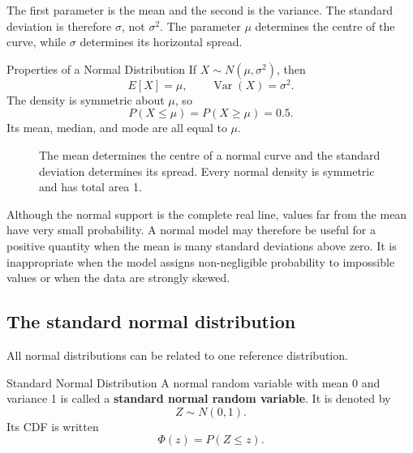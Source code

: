 The first parameter is the mean and the second is the variance. The standard deviation is therefore $\sigma$, not $\sigma^2$. The parameter $\mu$ determines the centre of the curve, while $\sigma$ determines its horizontal spread.

\begin{theorem}{Properties of a Normal Distribution}
If $X\sim N(\mu,\sigma^2)$, then
\[
    E[X]=\mu,
    \qquad
    \operatorname{Var}(X)=\sigma^2.
\]
The density is symmetric about $\mu$, so
\[
    P(X\leq\mu)=P(X\geq\mu)=0.5.
\]
Its mean, median, and mode are all equal to $\mu$.
\end{theorem}

\begin{figure}[htbp]
\centering
{}
\caption{The mean determines the centre of a normal curve and the standard deviation determines its spread. Every normal density is symmetric and has total area 1.}
\label{fig:normal-location-scale}
\end{figure}

Although the normal support is the complete real line, values far from the mean have very small probability. A normal model may therefore be useful for a positive quantity when the mean is many standard deviations above zero. It is inappropriate when the model assigns non-negligible probability to impossible values or when the data are strongly skewed.

\subsection{The standard normal distribution}

All normal distributions can be related to one reference distribution.

\begin{definition}{Standard Normal Distribution}
A normal random variable with mean 0 and variance 1 is called a \textbf{standard normal random variable}. It is denoted by
\[
    Z\sim N(0,1).
\]
Its CDF is written
\[
    \Phi(z)=P(Z\leq z).
\]
\end{definition}

